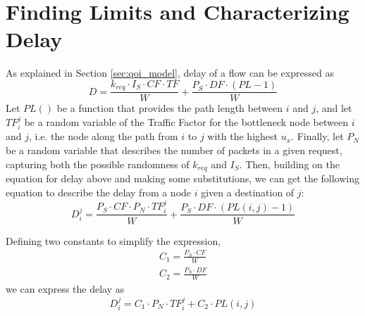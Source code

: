 \section{Finding Limits and Characterizing Delay}
\label{sec:delay_char}

As explained in Section \ref{sec:qoi_model}, delay of a flow can be expressed as
\begin{equation}
	D = \frac{ k_{req} \cdot I_S \cdot CF \cdot TF}{W} + \frac{P_S \cdot DF \cdot (PL-1)}{W}
\end{equation}
Let $PL()$ be a function that provides the path length between $i$ and $j$, and let $TF_{i}^{j}$ be a random variable of the Traffic Factor for the bottleneck node between $i$ and $j$, i.e. the node along the path from $i$ to $j$ with the highest $u_x$.  Finally, let $P_N$ be a random variable that describes the number of packets in a given request, capturing both the possible randomness of $k_{req}$ and $I_S$.  
Then, building on the equation for delay above and making some substitutions, we can get the following equation to describe the delay from a node $i$ given a destination of $j$:
\begin{equation}
	D_{i}^{j} = \frac{ P_S \cdot CF \cdot P_N \cdot TF_{i}^{j}}{W}  + \frac{P_S \cdot DF \cdot (PL(i,j)-1)}{W}
\end{equation}

Defining two constants to simplify the expression,
\begin{eqnarray*}
	C_1 = \frac{P_S \cdot CF}{W} \\
	C_2 = \frac{P_S \cdot DF}{W}
\end{eqnarray*}
we can express the delay as
\begin{equation}
	D_{i}^{j} = C_1 \cdot P_N \cdot TF_{i}^{j} + C_2 \cdot PL(i,j)
\end{equation}

